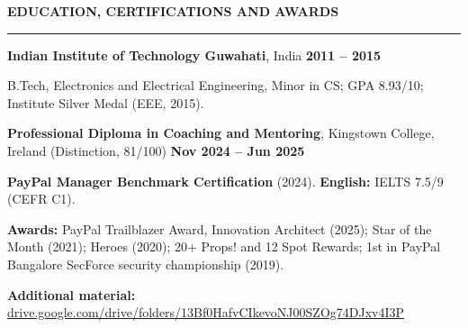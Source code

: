 \documentclass[10pt,a4paper]{article}
\newcommand{\sect}[1]{%
  \par\vspace{4pt}%
  {\bfseries\fontsize{10}{11.5}\selectfont #1}\par\nointerlineskip
  \vspace{1pt}\noindent\rule{\linewidth}{0.6pt}\par\vspace{2.5pt}}
\begin{document}
\sect{EDUCATION, CERTIFICATIONS AND AWARDS}
\noindent\textbf{Indian Institute of Technology Guwahati}, India \hfill \textbf{2011 -- 2015}\par
B.Tech, Electronics and Electrical Engineering, Minor in CS; GPA 8.93/10; Institute Silver Medal (EEE, 2015).\par
\vspace{1.5pt}
\noindent\textbf{Professional Diploma in Coaching and Mentoring}, Kingstown College, Ireland (Distinction, 81/100)
\hfill \textbf{Nov 2024 -- Jun 2025}\par
\noindent\textbf{PayPal Manager Benchmark Certification} (2024). \textbf{English:} IELTS 7.5/9 (CEFR C1).\par
\vspace{1.5pt}
\noindent\textbf{Awards:} PayPal Trailblazer Award, Innovation Architect (2025); Star of the Month (2021);
Heroes (2020); 20+ Props! and 12 Spot Rewards; 1st in PayPal Bangalore SecForce security
championship (2019).
\par\vspace{1.5pt}
\noindent\textbf{Additional material:}
\href{https://drive.google.com/drive/folders/13Bf0HafvCIkevoNJ00SZOg74DJxv4I3P}{drive.google.com/drive/folders/13Bf0HafvCIkevoNJ00SZOg74DJxv4I3P}
\end{document}
